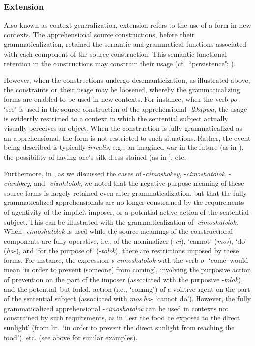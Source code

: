 \documentclass[output=paper,colorlinks,citecolor=brown]{langscibook}
\begin{document}
\subsubsection{Extension}
\label{subsubsec:extension}

Also known as context generalization, extension refers to the use of a form in new contexts. The apprehensional source constructions, before their grammaticalization, retained the semantic and grammatical functions associated with each component of the source construction. This semantic-functional retention in the constructions may constrain their usage (cf.\ ``persistence"; \citealt{Hopper1991}). 

However, when the constructions undergo desemanticization, as illustrated above, the constraints on their usage may be loosened, whereby the grammaticalizing forms are enabled to be used in new contexts. For instance, when the verb \textit{po}- `see' is used in the source construction of the apprehensional \nobreakdash-\textit{lkkapwa,} the usage is evidently restricted to a context in which the sentential subject actually visually perceives an object. When the construction is fully grammaticalized as an apprehensional, the form is not restricted to such situations. Rather, the event being described is typically \textit{irrealis}, e.g., an imagined war in the future (as in ), the possibility of having one's silk dress stained (as in ), etc.   

Furthermore, in , as we discussed the cases of \nobreakdash-\textit{cimoshakey}, \nobreakdash-\textit{cimoshatolok}, \nobreakdash-\textit{cianhkey}, and \nobreakdash-\textit{cianhtolok}, we noted that the negative purpose meaning of these source forms is largely retained even after grammaticalization, but that the fully grammaticalized apprehensionals are no longer constrained by the requirements of agentivity of the implicit imposer, or a potential active action of the sentential subject. This can be illustrated with the grammaticalization of \nobreakdash-\textit{cimoshatolok}. When \nobreakdash-\textit{cimoshatolok} is used while the source meanings of the constructional components are fully operative, i.e., of the nominalizer (\nobreakdash-\textit{ci}), `cannot' (\textit{mos}), `do' (\textit{ha}-), and `for the purpose of' (\nobreakdash-\textit{tolok}), there are restrictions imposed by these forms. For instance, the expression \textit{o-cimoshatolok} with the verb \textit{o-} `come' would mean `in order to prevent (someone) from coming', involving the purposive action of prevention on the part of the imposer (associated with the purposive \nobreakdash-\textit{tolok}), and the potential, but foiled, action (i.e., `coming') of a volitive agent on the part of the sentential subject (associated with \textit{mos} \textit{ha}- `cannot do'). However, the fully grammaticalized apprehensional \nobreakdash-\textit{cimoshatolok} can be used in contexts not constrained by such requirements, as in `lest the food be exposed to the direct sunlight' (from lit.\  `in order to prevent the direct sunlight from reaching the food'), etc. (see  above for similar examples). 
\end{document}
